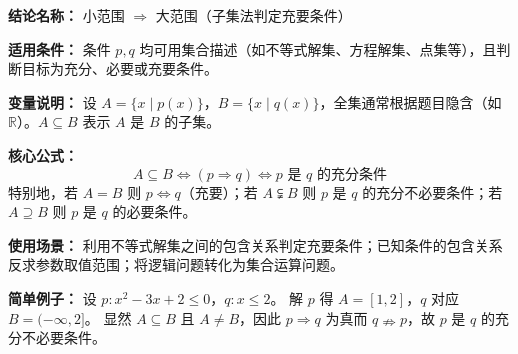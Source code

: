 \textbf{结论名称：} 小范围 \(\Rightarrow\) 大范围（子集法判定充要条件）

\textbf{适用条件：} 条件 \(p,q\) 均可用集合描述（如不等式解集、方程解集、点集等），且判断目标为充分、必要或充要条件。

\textbf{变量说明：} 设 \(A=\{x\mid p(x)\}\)，\(B=\{x\mid q(x)\}\)，全集通常根据题目隐含（如 \(\mathbb{R}\)）。\(A\subseteq B\) 表示 \(A\) 是 \(B\) 的子集。

\textbf{核心公式：}
\[
\boxed{A\subseteq B \iff (p\Rightarrow q) \iff p\text{ 是 }q\text{ 的充分条件}}
\]
特别地，若 \(A=B\) 则 \(p\Leftrightarrow q\)（充要）；若 \(A\subsetneqq B\) 则 \(p\) 是 \(q\) 的充分不必要条件；若 \(A\supseteq B\) 则 \(p\) 是 \(q\) 的必要条件。

\textbf{使用场景：} 利用不等式解集之间的包含关系判定充要条件；已知条件的包含关系反求参数取值范围；将逻辑问题转化为集合运算问题。

\textbf{简单例子：} 设 \(p: x^2-3x+2\le 0\)，\(q: x\le 2\)。  
解 \(p\) 得 \(A=[1,2]\)，\(q\) 对应 \(B=(-\infty,2]\)。  
显然 \(A\subseteq B\) 且 \(A\neq B\)，因此 \(p\Rightarrow q\) 为真而 \(q\nRightarrow p\)，故 \(p\) 是 \(q\) 的充分不必要条件。